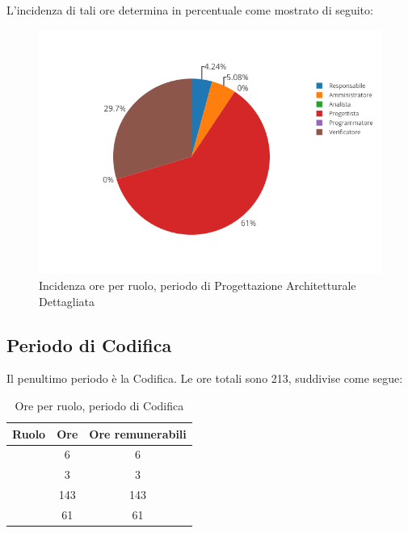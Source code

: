 L'incidenza di tali ore determina in percentuale come mostrato di seguito:
\begin{figure}[H]
	\centering
	\includegraphics[scale=0.6]{img/ProgettazioneDettaglio.png}
	\caption{Incidenza ore per ruolo, periodo di Progettazione Architetturale Dettagliata}
\end{figure}

\subsection{Periodo di Codifica}
Il penultimo periodo è la Codifica. Le ore totali sono 213, suddivise come segue:

\begin{table}[H]
	\begin{center}
		\begin{tabular}{|c|c|c|}
			\hline
			\textbf{Ruolo}	& \textbf{Ore}	& \textbf{Ore remunerabili} \\
			\hline
			\Res	&	6	&	6	\\
			\hline
			\Amm	&	3	&	3	\\
			\hline
			\Progr   &	143   &	143	\\
			\hline
			\Ver	&	61	&	61	\\
			\hline
		\end{tabular}
	\end{center}
	\caption{Ore per ruolo, periodo di Codifica}
\end{table}

